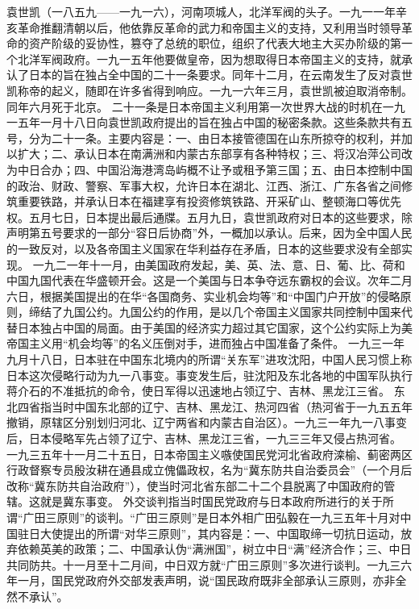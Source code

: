 \begin{maonote}
袁世凯（一八五九——一九一六），河南项城人，北洋军阀的头子。一九一一年辛亥革命推翻清朝以后，他依靠反革命的武力和帝国主义的支持，又利用当时领导革命的资产阶级的妥协性，篡夺了总统的职位，组织了代表大地主大买办阶级的第一个北洋军阀政府。一九一五年他要做皇帝，因为想取得日本帝国主义的支持，就承认了日本的旨在独占全中国的二十一条要求。同年十二月，在云南发生了反对袁世凯称帝的起义，随即在许多省得到响应。一九一六年三月，袁世凯被迫取消帝制。同年六月死于北京。
二十一条是日本帝国主义利用第一次世界大战的时机在一九一五年一月十八日向袁世凯政府提出的旨在独占中国的秘密条款。这些条款共有五号，分为二十一条。主要内容是：一、由日本接管德国在山东所掠夺的权利，并加以扩大；二、承认日本在南满洲和内蒙古东部享有各种特权；三、将汉冶萍公司改为中日合办；四、中国沿海港湾岛屿概不让予或租予第三国；五、由日本控制中国的政治、财政、警察、军事大权，允许日本在湖北、江西、浙江、广东各省之间修筑重要铁路，并承认日本在福建享有投资修筑铁路、开采矿山、整顿海口等优先权。五月七日，日本提出最后通牒。五月九日，袁世凯政府对日本的这些要求，除声明第五号要求的一部分“容日后协商”外，一概加以承认。后来，因为全中国人民的一致反对，以及各帝国主义国家在华利益存在矛盾，日本的这些要求没有全部实现。
一九二一年十一月，由美国政府发起，美、英、法、意、日、葡、比、荷和中国九国代表在华盛顿开会。这是一个美国与日本争夺远东霸权的会议。次年二月六日，根据美国提出的在华“各国商务、实业机会均等”和“中国门户开放”的侵略原则，缔结了九国公约。九国公约的作用，是以几个帝国主义国家共同控制中国来代替日本独占中国的局面。由于美国的经济实力超过其它国家，这个公约实际上为美帝国主义用“机会均等”的名义压倒对手，进而独占中国准备了条件。
一九三一年九月十八日，日本驻在中国东北境内的所谓“关东军”进攻沈阳，中国人民习惯上称日本这次侵略行动为九一八事变。事变发生后，驻沈阳及东北各地的中国军队执行蒋介石的不准抵抗的命令，使日军得以迅速地占领辽宁、吉林、黑龙江三省。
东北四省指当时中国东北部的辽宁、吉林、黑龙江、热河四省（热河省于一九五五年撤销，原辖区分别划归河北、辽宁两省和内蒙古自治区）。一九三一年九一八事变后，日本侵略军先占领了辽宁、吉林、黑龙江三省，一九三三年又侵占热河省。
一九三五年十一月二十五日，日本帝国主义嗾使国民党河北省政府滦榆、蓟密两区行政督察专员殷汝耕在通县成立傀儡政权，名为“冀东防共自治委员会”（一个月后改称“冀东防共自治政府”），使当时河北省东部二十二个县脱离了中国政府的管辖。这就是冀东事变。
外交谈判指当时国民党政府与日本政府所进行的关于所谓“广田三原则”的谈判。“广田三原则”是日本外相广田弘毅在一九三五年十月对中国驻日大使提出的所谓“对华三原则”，其内容是：一、中国取缔一切抗日运动，放弃依赖英美的政策；二、中国承认伪“满洲国”，树立中日“满”经济合作；三、中日共同防共。十一月至十二月间，中日双方就“广田三原则”多次进行谈判。一九三六年一月，国民党政府外交部发表声明，说“国民政府既非全部承认三原则，亦非全然不承认”。

\end{maonote}
